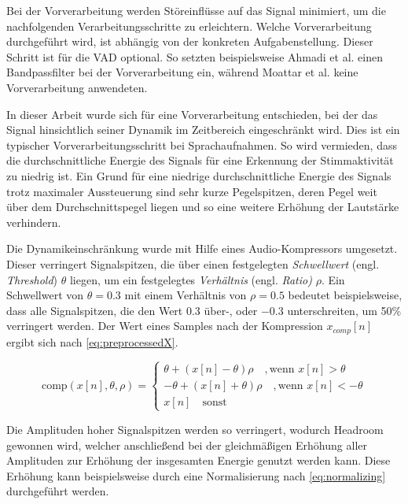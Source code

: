 Bei der Vorverarbeitung werden Störeinflüsse auf das Signal minimiert, um die nachfolgenden Verarbeitungsschritte zu erleichtern. Welche Vorverarbeitung durchgeführt wird, ist abhängig von der konkreten Aufgabenstellung. Dieser Schritt ist für die VAD optional. So setzten beispielsweise Ahmadi et al. \cite{vad_ceps} einen Bandpassfilter bei der Vorverarbeitung ein, während Moattar et al. \cite{vad_Easy} keine Vorverarbeitung anwendeten. 

In dieser Arbeit wurde sich für eine Vorverarbeitung entschieden, bei der das Signal hinsichtlich seiner Dynamik im Zeitbereich eingeschränkt wird. Dies ist ein typischer Vorverarbeitungsschritt bei Sprachaufnahmen. So wird vermieden, dass die durchschnittliche Energie des Signals für eine Erkennung der Stimmaktivität zu niedrig ist. Ein Grund für eine niedrige durchschnittliche Energie des Signals trotz maximaler Aussteuerung sind sehr kurze Pegelspitzen, deren Pegel weit über dem Durchschnittspegel liegen und so eine weitere Erhöhung der Lautstärke verhindern.

Die Dynamikeinschränkung wurde mit Hilfe eines Audio-Kompressors umgesetzt. Dieser verringert Signalspitzen, die über einen festgelegten \emph{Schwellwert} (engl. \emph{Threshold}) $\theta$ liegen, um ein festgelegtes \emph{Verhältnis} (engl. \emph{Ratio)} $\rho$. Ein Schwellwert von $\theta = 0.3$ mit einem Verhältnis von $\rho = 0.5$ bedeutet beispielsweise, dass alle Signalspitzen, die den Wert 0.3 über-, oder $-0.3$ unterschreiten, um 50\% verringert werden. Der Wert eines Samples nach der Kompression $x_{comp}[n]$ ergibt sich nach \autoref{eq:preprocessedX}.

\begin{equation}
\text{comp}(x[n], \theta, \rho) =
\begin{cases}
\theta + (x[n] - \theta) \rho \quad , \text{wenn } x[n] > \theta \\
-\theta + (x[n] + \theta) \rho \quad, \text{wenn } x[n] < -\theta \\
x[n] \quad \text{sonst}
\end{cases}
\label{eq:preprocessedX}
\end{equation}

Die Amplituden hoher Signalspitzen werden so verringert, wodurch Headroom gewonnen wird, welcher anschließend bei der gleichmäßigen Erhöhung aller Amplituden zur Erhöhung der insgesamten Energie genutzt werden kann. Diese Erhöhung kann beispielsweise durch eine Normalisierung nach \autoref{eq:normalizing} durchgeführt werden.

